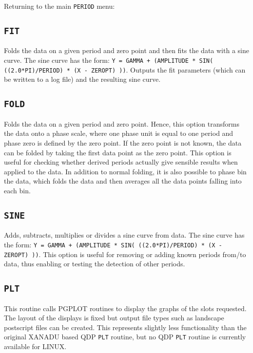 \clearpage
Returning to the main {\tt PERIOD} menu:

\subsection*{\tt FIT}

Folds the data on a given period and zero point and then fits the data with a
sine curve. The sine curve has the form: {\tt Y = GAMMA + (AMPLITUDE * SIN(
((2.0*PI)/PERIOD) * (X - ZEROPT) ))}. Outputs the fit parameters (which can be
written to a log file) and the resulting sine curve.

\subsection*{\tt FOLD}

Folds the data on a given period and zero point. Hence, this option transforms
the data onto a phase scale, where one phase unit is equal to one period and
phase zero is defined by the zero point. If the zero point is not known, the
data can be folded by taking the first data point as the zero point. This
option is useful for checking whether derived periods actually give sensible
results when applied to the data. In addition to normal folding, it is also
possible to phase bin the data, which folds the data and then averages all the
data points falling into each bin.

\subsection*{\tt SINE}

Adds, subtracts, multiplies or divides a sine curve from data. The sine curve
has the form: {\tt Y = GAMMA + (AMPLITUDE * SIN( ((2.0*PI)/PERIOD) * (X -
ZEROPT) ))}. This option is useful for removing or adding known periods from/to
data, thus enabling or testing the detection of other periods.

\subsection*{\tt PLT}

This routine calls PGPLOT routines to display the graphs of the slots
requested. The layout of the displays is fixed but output file
types such as landscape postscript files can be created. This
represents slightly less functionality than the original XANADU based
QDP {\tt PLT} routine, but no QDP {\tt PLT} routine is currently available for
LINUX.

